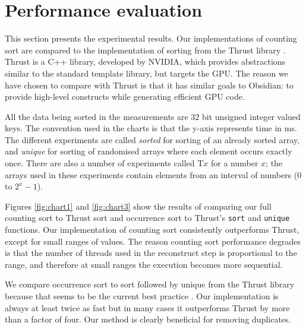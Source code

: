 
\section{Performance evaluation} 
\label{sec:Benchmarks}

\FloatBarrier

This section presents the experimental results. Our implementations of
counting sort are compared to the implementation of sorting from the
Thrust library \cite{THRUST}. Thrust is a C++ library, developed by
NVIDIA, which provides abstractions similar to the standard template
library, but targets the GPU. The reason we have chosen to compare with
Thrust is that it has similar goals to Obsidian: to provide high-level 
constructs while generating efficient GPU code.

All the data being sorted in the measurements are 32 bit unsigned
integer valued keys.
The convention used in the charts is that the y-axis represents time in ms. 
The different experiments are called {\em sorted} for sorting of an 
already sorted array, and {\em unique} for sorting of randomised arrays where each 
element occurs exactly once. There are also a number of experiments called 
T$x$ for a number $x$;  the arrays used in these experiments contain
elements from an interval of numbers (0 to $2^x-1$). 

Figures \ref{fig:chart1} and \ref{fig:chart3} show the results of
comparing our full counting sort to Thrust sort and occurrence sort
 to Thrust's {\tt sort} and {\tt unique} functions.
Our implementation of
counting sort consistently outperforms Thrust, except for small ranges
of values. The reason counting sort performance degrades is that the
number of threads used in the reconstruct step is proportional to the
range, and therefore at small ranges the execution becomes more
sequential.

We compare occurrence sort to sort followed by unique from
the Thrust library because that seems to be the current best practice
\cite{REMOVEDUPS}. Our implementation is always at least twice as fast
but in many cases it outperforms Thrust by more than a factor of four.
Our method is clearly beneficial for removing duplicates.



